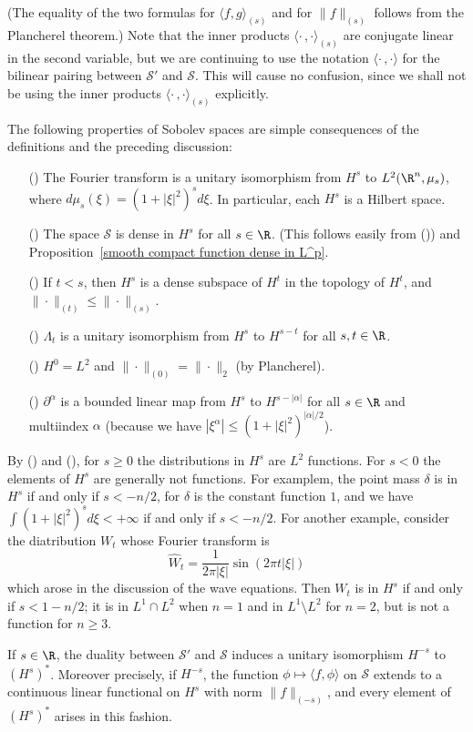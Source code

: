 (The equality of the two formulas for $\langle f,g\rangle_{(s)}$ and for $\|f\|_{(s)}$ follows from the Plancherel theorem.) Note that the inner products $\langle\cdot\,,\cdot\rangle_{(s)}$ are conjugate linear in the second variable, but we are continuing to use the notation $\langle\cdot\,,\cdot\rangle$ for the bilinear pairing between $\mathscr{S}'$ and $\mathscr{S}$. This will cause no confusion, since we shall not be using the inner products $\langle\cdot\,,\cdot\rangle_{(s)}$ explicitly.\par
The following properties of Sobolev spaces are simple consequences of the definitions and the preceding discussion:
\begin{itemize}
\item[(\rmnum{1})] The Fourier transform is a unitary isomorphism from $H^s$ to $L^2(\R^n,\mu_s)$, where $d\mu_s(\xi)=(1+|\xi|^2)^sd\xi$. In particular, each $H^s$ is a Hilbert space.
\item[(\rmnum{2})] The space $\mathscr{S}$ is dense in $H^s$ for all $s\in\R$. (This follows easily from ()) and Proposition~\ref{smooth compact function dense in L^p}.
\item[(\rmnum{3})] If $t<s$, then $H^s$ is a dense subspace of $H^t$ in the topology of $H^t$, and $\|\cdot\|_{(t)}\leq\|\cdot\|_{(s)}$.
\item[(\rmnum{4})] $\Lambda_t$ is a unitary isomorphism from $H^s$ to $H^{s-t}$ for all $s,t\in\R$.
\item[(\rmnum{5})] $H^0=L^2$ and $\|\cdot\|_{(0)}=\|\cdot\|_2$ (by Plancherel). 
\item[(\rmnum{6})] $\partial^\alpha$ is a bounded linear map from $H^s$ to $H^{s-|\alpha|}$ for all $s\in\R$ and multiindex $\alpha$ (because we have $|\xi^\alpha|\leq(1+|\xi|^2)^{|\alpha|/2}$). 
\end{itemize}
By () and (), for $s\geq 0$ the distributions in $H^s$ are $L^2$ functions. For $s<0$ the elements of $H^s$ are generally not functions. For examplem, the point mass $\delta$ is in $H^s$ if and only if $s<-n/2$, for $\hat{\delta}$ is the constant function $1$, and we have $\int(1+|\xi|^2)^sd\xi<+\infty$ if and only if $s<-n/2$. For another example, consider the diatribution $W_t$ whose Fourier transform is
\[\hat{W}_t=\frac{1}{2\pi|\xi|}\sin(2\pi t|\xi|)\]
which arose in the discussion of the wave equations. Then $W_t$ is in $H^s$ if and only if $s<1-n/2$; it is in $L^1\cap L^2$ when $n=1$ and in $L^1\setminus L^2$ for $n=2$, but is not a function for $n\geq 3$.
\begin{proposition}\label{Sobolev space dual char}
If $s\in\R$, the duality between $\mathscr{S}'$ and $\mathscr{S}$ induces a unitary isomorphism $H^{-s}$ to $(H^s)^*$. Moreover precisely, if $H^{-s}$, the function $\phi\mapsto\langle f,\phi\rangle$ on $\mathscr{S}$ extends to a continuous linear functional on $H^s$ with norm $\|f\|_{(-s)}$, and every element of $(H^s)^*$ arises in this fashion.
\end{proposition}
